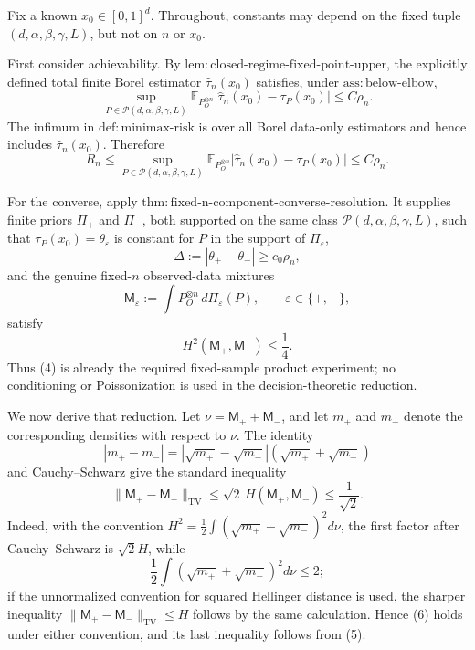 Fix a known \(x_0\in[0,1]^d\).  Throughout, constants may depend on the fixed tuple \((d,\alpha,\beta,\gamma,L)\), but not on \(n\) or \(x_0\).

First consider achievability.  By \(\mathrm{lem:closed\mbox{-}regime\mbox{-}fixed\mbox{-}point\mbox{-}upper}\), the explicitly defined total finite Borel estimator \(\widehat\tau_n(x_0)\) satisfies, under \(\mathrm{ass:below\mbox{-}elbow}\),
\[
 \sup_{P\in\mathcal P(d,\alpha,\beta,\gamma,L)}
 \mathbb E_{P_O^{\otimes n}}
 \left|\widehat\tau_n(x_0)-\tau_P(x_0)\right|
 \le C\rho_n .                                                   \tag{1}
\]
The infimum in \(\mathrm{def:minimax\mbox{-}risk}\) is over all Borel data-only estimators and hence includes \(\widehat\tau_n(x_0)\).  Therefore
\[
 R_n
 \le
 \sup_{P\in\mathcal P(d,\alpha,\beta,\gamma,L)}
 \mathbb E_{P_O^{\otimes n}}
 \left|\widehat\tau_n(x_0)-\tau_P(x_0)\right|
 \le C\rho_n .                                                   \tag{2}
\]

For the converse, apply \(\mathrm{thm:fixed\mbox{-}n\mbox{-}component\mbox{-}converse\mbox{-}resolution}\).  It supplies finite priors \(\Pi_+\) and \(\Pi_-\), both supported on the same class \(\mathcal P(d,\alpha,\beta,\gamma,L)\), such that \(\tau_P(x_0)=\theta_\varepsilon\) is constant for \(P\) in the support of \(\Pi_\varepsilon\),
\[
 \Delta:=|\theta_+-\theta_-|\ge c_0\rho_n,                       \tag{3}
\]
and the genuine fixed-\(n\) observed-data mixtures
\[
 \mathsf M_\varepsilon
 :=\int P_O^{\otimes n}\,d\Pi_\varepsilon(P),
 \qquad \varepsilon\in\{+,-\},                                  \tag{4}
\]
satisfy
\[
 H^2(\mathsf M_+,\mathsf M_-)\le\frac14.                         \tag{5}
\]
Thus (4) is already the required fixed-sample product experiment; no conditioning or Poissonization is used in the decision-theoretic reduction.

We now derive that reduction.  Let \(\nu=\mathsf M_++\mathsf M_-\), and let \(m_+\) and \(m_-\) denote the corresponding densities with respect to \(\nu\).  The identity
\[
 |m_+-m_-|=|\sqrt{m_+}-\sqrt{m_-}|(\sqrt{m_+}+\sqrt{m_-})
\]
and Cauchy--Schwarz give the standard inequality
\[
 \|\mathsf M_+-\mathsf M_-\|_{\mathrm{TV}}
 \le \sqrt{2}\,H(\mathsf M_+,\mathsf M_-)
 \le\frac1{\sqrt2}.                                             \tag{6}
\]
Indeed, with the convention \(H^2=\tfrac12\int(\sqrt{m_+}-\sqrt{m_-})^2d\nu\), the first factor after Cauchy--Schwarz is \(\sqrt2 H\), while
\[
 \frac12\int(\sqrt{m_+}+\sqrt{m_-})^2d\nu\le2;
\]
if the unnormalized convention for squared Hellinger distance is used, the sharper inequality \(\|\mathsf M_+-\mathsf M_-\|_{\mathrm{TV}}\le H\) follows by the same calculation.  Hence (6) holds under either convention, and its last inequality follows from (5).

